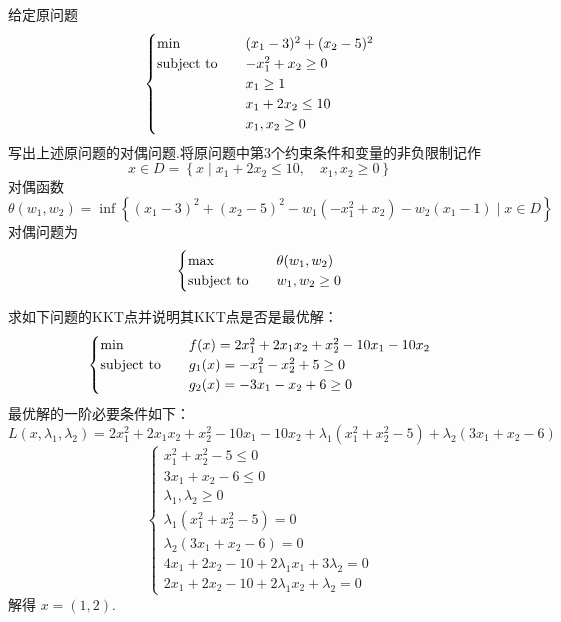 \begin{problem}[P243 12]
    给定原问题\[\begin{cases}
        \min\quad &(x_1 - 3)^2 + (x_2 - 5)^2\\
        \operatorname{subject\ to}\quad &-x_1^2 + x_2 \ge 0\\
        &x_1 \ge 1\\
        &x_1 + 2x_2 \le 10\\
        &x_1, x_2 \ge 0
    \end{cases}\]
    写出上述原问题的对偶问题.将原问题中第3个约束条件和变量的非负限制记作\[x \in D=\left\{x \mid x_{1}+2 x_{2} \le 10, \quad x_{1}, x_{2} \ge 0\right\} \]
    \Answer 对偶函数\[\theta(w_1, w_2) = \inf\left\{(x_1 - 3)^2 + (x_2 - 5)^2 - w_1(-x_1^2 + x_2) - w_2(x_1 - 1) \mid x \in D\right\}\]对偶问题为 \[\begin{cases}
        \max \quad &\theta(w_1, w_2)\\
        \operatorname{subject\ to} \quad &w_1, w_2 \ge 0
    \end{cases}\]
\end{problem}

\begin{problem}
    求如下问题的KKT点并说明其KKT点是否是最优解：
    \[\begin{cases}
        \min \quad &f(x) = 2x_1^2 + 2x_1x_2 + x_2^2 - 10x_1 - 10x_2\\
        \operatorname{subject\ to} \quad &g_1(x) = -x_1^2 - x_2^2 + 5 \ge 0\\
        &g_2(x) = -3x_1 - x_2 + 6 \ge 0
    \end{cases}\]
    \Answer 最优解的一阶必要条件如下：$L(x, \lambda_1, \lambda_2) = 2x_1^2 + 2x_1x_2 + x_2^2 - 10x_1 - 10x_2 + \lambda_1(x_1^2 + x_2^2 - 5) + \lambda_2(3x_1 + x_2 - 6)$\[\begin{cases}
        x_1^2 + x_2^2 - 5 \le 0\\
        3x_1 + x_2 - 6 \le 0\\
        \lambda_1, \lambda_2 \ge 0\\
        \lambda_1(x_1^2 + x_2^2 - 5) = 0\\
        \lambda_2(3x_1 + x_2 - 6) = 0\\
        4x_1 + 2x_2 - 10 + 2\lambda_1x_1 + 3\lambda_2 = 0\\
        2x_1 + 2x_2 - 10 + 2\lambda_1x_2 + \lambda_2 = 0
    \end{cases}\]
    解得 $x = (1, 2)$. 
\end{problem}

